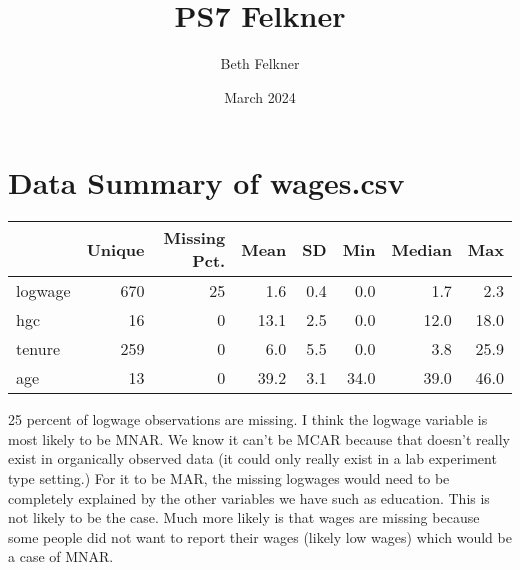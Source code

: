 \documentclass{article}
\title{PS7 Felkner}
\author{Beth Felkner}
\date{March 2024}
\begin{document}
\maketitle

\section{Data Summary of wages.csv}

\begin{table}[H]
\centering
\begin{tabular}[t]{lrrrrrrr}
\toprule
  & Unique & Missing Pct. & Mean & SD & Min & Median & Max\\
\midrule
logwage & 670 & 25 & \num{1.6} & \num{0.4} & \num{0.0} & \num{1.7} & \num{2.3}\\
hgc & 16 & 0 & \num{13.1} & \num{2.5} & \num{0.0} & \num{12.0} & \num{18.0}\\
tenure & 259 & 0 & \num{6.0} & \num{5.5} & \num{0.0} & \num{3.8} & \num{25.9}\\
age & 13 & 0 & \num{39.2} & \num{3.1} & \num{34.0} & \num{39.0} & \num{46.0}\\
\bottomrule
\end{tabular}
\end{table}

25 percent of logwage observations are missing. I think the logwage variable is most likely to be MNAR. We know it can't be MCAR because that doesn't really exist in organically observed data (it could only really exist in a lab experiment type setting.) For it to be MAR, the missing logwages would need to be completely explained by the other variables we have such as education. This is not likely to be the case. Much more likely is that wages are missing because some people did not want to report their wages (likely low wages) which would be a case of MNAR.
\end{document}
